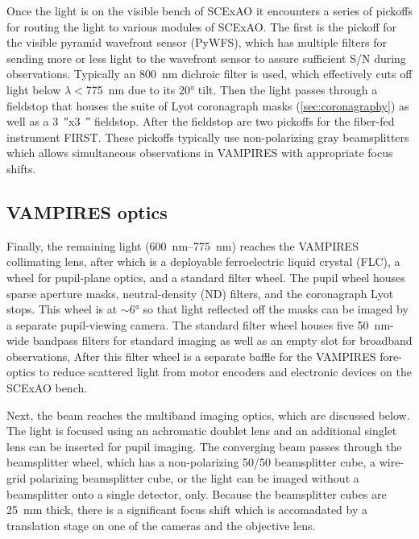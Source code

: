 Once the light is on the visible bench of SCExAO it encounters a series of pickoffs for routing the light to various modules of SCExAO. The first is the pickoff for the visible pyramid wavefront sensor (PyWFS), which has multiple filters for sending more or less light to the wavefront sensor to assure sufficient S/N during observations. Typically an \SI{800}{\nano\meter} dichroic filter is used, which effectively cuts off light below $\lambda <$\SI{775}{\nano\meter} due to its \ang{20} tilt. Then the light passes through a fieldstop that houses the suite of Lyot coronagraph masks (\autoref{sec:coronagraphy}) as well as a \SI{3}{\arcsecond}x\SI{3}{\arcsecond} fieldstop. After the fieldstop are two pickoffs for the fiber-fed instrument FIRST. These pickoffs typically use non-polarizing gray beamsplitters which allows simultaneous observations in VAMPIRES with appropriate focus shifts.

\subsection{VAMPIRES optics}

Finally, the remaining light (\SIrange{600}{775}{\nano\meter}) reaches the VAMPIRES collimating lens, after which is a deployable ferroelectric liquid crystal (FLC), a wheel for pupil-plane optics, and a standard filter wheel. The pupil wheel houses sparse aperture masks, neutral-density (ND) filters, and the coronagraph Lyot stops. This wheel is at $\sim$\ang{6} so that light reflected off the masks can be imaged by a separate pupil-viewing camera. The standard filter wheel houses five \SI{50}{\nano\meter}-wide bandpass filters for standard imaging as well as an empty slot for broadband observations, After this filter wheel is a separate baffle for the VAMPIRES fore-optics to reduce scattered light from motor encoders and electronic devices on the SCExAO bench.

Next, the beam reaches the multiband imaging optics, which are discussed below. The light is focused using an achromatic doublet lens and an additional singlet lens can be inserted for pupil imaging. The converging beam passes through the beamsplitter wheel, which has a non-polarizing 50/50 beamsplitter cube, a wire-grid polarizing beamsplitter cube, or the light can be imaged without a beamsplitter onto a single detector, only. Because the beamsplitter cubes are \SI{25}{\milli\meter} thick, there is a significant focus shift which is accomadated by a translation stage on one of the cameras and the objective lens. 

